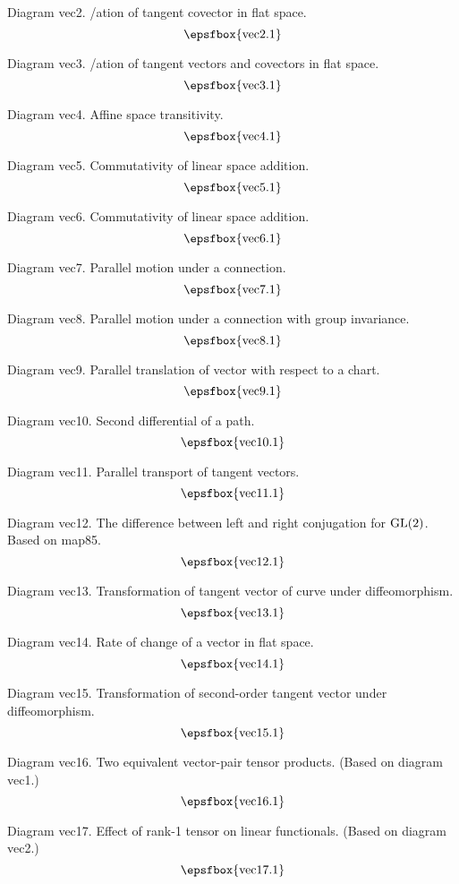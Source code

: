 Diagram vec2. \Visualis/ation of tangent covector in flat space.
$$
\centerline{\epsfbox{vec2.1}}
$$

Diagram vec3. \Visualis/ation of tangent vectors and covectors in flat space.
$$
\centerline{\epsfbox{vec3.1}}
$$

Diagram vec4. Affine space transitivity.
$$
\centerline{\epsfbox{vec4.1}}
$$

Diagram vec5. Commutativity of linear space addition.
$$
\centerline{\epsfbox{vec5.1}}
$$

\filleject

Diagram vec6. Commutativity of linear space addition.
$$
\centerline{\epsfbox{vec6.1}}
$$

Diagram vec7. Parallel motion under a connection.
$$
\centerline{\epsfbox{vec7.1}}
$$

Diagram vec8. Parallel motion under a connection with group invariance.
$$
\centerline{\epsfbox{vec8.1}}
$$

Diagram vec9. Parallel translation of vector with respect to a chart.
$$
\centerline{\epsfbox{vec9.1}}
$$

Diagram vec10. Second differential of a path.
$$
\centerline{\epsfbox{vec10.1}}
$$

\filleject

Diagram vec11. Parallel transport of tangent vectors.
$$
\centerline{\epsfbox{vec11.1}}
$$

Diagram vec12. The difference between left and right conjugation for
$\gp{GL}(2)$. Based on map85.
$$
\centerline{\epsfbox{vec12.1}}
$$

Diagram vec13. Transformation of tangent vector of curve under diffeomorphism.
$$
\centerline{\epsfbox{vec13.1}}
$$

Diagram vec14. Rate of change of a vector in flat space.
$$
\centerline{\epsfbox{vec14.1}}
$$

\filleject

Diagram vec15. Transformation of second-order tangent vector under
diffeomorphism.
$$
\centerline{\epsfbox{vec15.1}}
$$

Diagram vec16. Two equivalent vector-pair tensor products. (Based on diagram
vec1.)
$$
\centerline{\epsfbox{vec16.1}}
$$

Diagram vec17. Effect of rank-1 tensor on linear functionals. (Based on diagram
vec2.)
$$
\centerline{\epsfbox{vec17.1}}
$$

